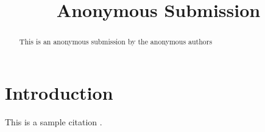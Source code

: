 \title{Anonymous Submission}
\begin{abstract}
    This is an anonymous submission by the anonymous authors
\end{abstract}
\maketitle

\section{Introduction}
\label{s:introduction}

This is a sample citation \cite{wasm-r3}.
